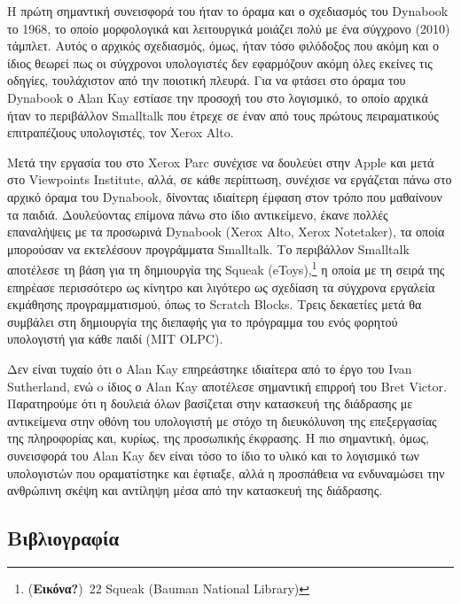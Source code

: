 \documentclass[
]{article}
\begin{document}
Η πρώτη σημαντική συνεισφορά του ήταν το όραμα και ο σχεδιασμός του
Dynabook το 1968, το οποίο μορφολογικά και λειτουργικά μοιάζει πολύ με
ένα σύγχρονο (2010) τάμπλετ. Αυτός ο αρχικός σχεδιασμός, όμως, ήταν τόσο
φιλόδοξος που ακόμη και ο ίδιος θεωρεί πως οι σύγχρονοι υπολογιστές δεν
εφαρμόζουν ακόμη όλες εκείνες τις οδηγίες, τουλάχιστον από την ποιοτική
πλευρά. Για να φτάσει στο όραμα του Dynabook ο Alan Kay εστίασε την
προσοχή του στο λογισμικό, το οποίο αρχικά ήταν το περιβάλλον Smalltalk
που έτρεχε σε έναν από τους πρώτους πειραματικούς επιτραπέζιους
υπολογιστές, τον Xerox Alto.

Μετά την εργασία του στο Xerox Parc συνέχισε να δουλεύει στην Apple και
μετά στο Viewpoints Institute, αλλά, σε κάθε περίπτωση, συνέχισε να
εργάζεται πάνω στο αρχικό όραμα του Dynabook, δίνοντας ιδιαίτερη έμφαση
στον τρόπο που μαθαίνουν τα παιδιά. Δουλεύοντας επίμονα πάνω στο ίδιο
αντικείμενο, έκανε πολλές επαναλήψεις με τα προσωρινά Dynabook (Xerox
Alto, Xerox Notetaker), τα οποία μπορούσαν να εκτελέσουν προγράμματα
Smalltalk. Το περιβάλλον Smalltalk αποτέλεσε τη βάση για τη δημιουργία
της Squeak (eToys),\footnote{(\textbf{Εικόνα?})~22 Squeak (Bauman
  National Library)} η οποία με τη σειρά της επηρέασε περισσότερο ως
κίνητρο και λιγότερο ως σχεδίαση τα σύγχρονα εργαλεία εκμάθησης
προγραμματισμού, όπως το Scratch Blocks. Τρεις δεκαετίες μετά θα
συμβάλει στη δημιουργία της διεπαφής για το πρόγραμμα του ενός φορητού
υπολογιστή για κάθε παιδί (MIT OLPC).

Δεν είναι τυχαίο ότι ο Alan Kay επηρεάστηκε ιδιαίτερα από το έργο του
Ivan Sutherland, ενώ o ίδιος ο Alan Kay αποτέλεσε σημαντική επιρροή του
Bret Victor. Παρατηρούμε ότι η δουλειά όλων βασίζεται στην κατασκευή της
διάδρασης με αντικείμενα στην οθόνη του υπολογιστή με στόχο τη
διευκόλυνση της επεξεργασίας της πληροφορίας και, κυρίως, της προσωπικής
έκφρασης. Η πιο σημαντική, όμως, συνεισφορά του Alan Kay δεν είναι τόσο
το ίδιο το υλικό και το λογισμικό των υπολογιστών που οραματίστηκε και
έφτιαξε, αλλά η προσπάθεια να ενδυναμώσει την ανθρώπινη σκέψη και
αντίληψη μέσα από την κατασκευή της διάδρασης.

\hypertarget{ux3b2ux3b9ux3b2ux3bbux3b9ux3bfux3b3ux3c1ux3b1ux3c6ux3afux3b1}{%
\subsection*{Βιβλιογραφία}\label{ux3b2ux3b9ux3b2ux3bbux3b9ux3bfux3b3ux3c1ux3b1ux3c6ux3afux3b1}}
\end{document}
